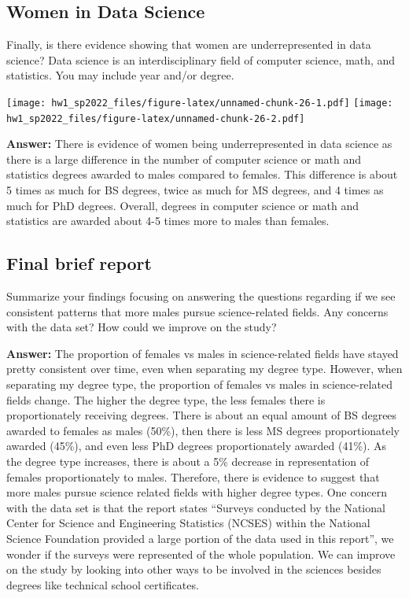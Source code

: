 \documentclass[
]{article}
\begin{document}
\hypertarget{women-in-data-science}{%
\subsection{Women in Data Science}\label{women-in-data-science}}

Finally, is there evidence showing that women are underrepresented in
data science? Data science is an interdisciplinary field of computer
science, math, and statistics. You may include year and/or degree.

\texttt{[image: hw1\_sp2022\_files/figure-latex/unnamed-chunk-26-1.pdf]}
\texttt{[image: hw1\_sp2022\_files/figure-latex/unnamed-chunk-26-2.pdf]}

\textbf{Answer:} There is evidence of women being underrepresented in
data science as there is a large difference in the number of computer
science or math and statistics degrees awarded to males compared to
females. This difference is about 5 times as much for BS degrees, twice
as much for MS degrees, and 4 times as much for PhD degrees. Overall,
degrees in computer science or math and statistics are awarded about 4-5
times more to males than females.

\hypertarget{final-brief-report}{%
\subsection{Final brief report}\label{final-brief-report}}

Summarize your findings focusing on answering the questions regarding if
we see consistent patterns that more males pursue science-related
fields. Any concerns with the data set? How could we improve on the
study?

\textbf{Answer:} The proportion of females vs males in science-related
fields have stayed pretty consistent over time, even when separating my
degree type. However, when separating my degree type, the proportion of
females vs males in science-related fields change. The higher the degree
type, the less females there is proportionately receiving degrees. There
is about an equal amount of BS degrees awarded to females as males
(50\%), then there is less MS degrees proportionately awarded (45\%),
and even less PhD degrees proportionately awarded (41\%). As the degree
type increases, there is about a 5\% decrease in representation of
females proportionately to males. Therefore, there is evidence to
suggest that more males pursue science related fields with higher degree
types. One concern with the data set is that the report states ``Surveys
conducted by the National Center for Science and Engineering Statistics
(NCSES) within the National Science Foundation provided a large portion
of the data used in this report'', we wonder if the surveys were
represented of the whole population. We can improve on the study by
looking into other ways to be involved in the sciences besides degrees
like technical school certificates.
\end{document}
